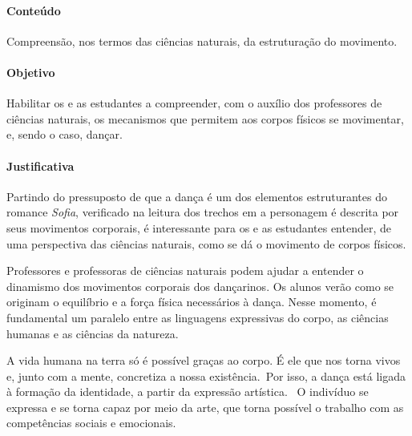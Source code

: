 \documentclass[12pt]{extarticle}
\begin{document}
\paragraph{Conteúdo} Compreensão, nos termos das ciências naturais, da estruturação do movimento.

\paragraph{Objetivo} Habilitar os e as estudantes a compreender, com o auxílio dos professores
de ciências naturais, os mecanismos que permitem aos corpos físicos se movimentar, e, sendo o caso,
dançar.

\paragraph{Justificativa} Partindo do pressuposto de que a dança é um dos elementos estruturantes
do romance \textit{Sofia}, verificado na leitura dos trechos em a personagem é descrita por seus
movimentos corporais, é interessante para os e as estudantes entender, de uma perspectiva
das ciências naturais, como se dá o movimento de corpos físicos. 

Professores e professoras de ciências naturais podem ajudar a
entender o dinamismo dos movimentos corporais dos dançarinos. Os alunos verão
como se originam o equilíbrio e a força física necessários à dança. Nesse momento, é fundamental
um paralelo entre as linguagens expressivas do corpo, as ciências humanas e as
ciências da natureza. 

A vida humana na terra só é possível graças ao corpo. É
ele que nos torna vivos e, junto com a mente, concretiza a nossa existência. Por isso, a dança está ligada à formação da identidade, a partir da expressão
artística.  O indivíduo se expressa e se torna capaz por meio da arte, que
torna possível o trabalho com as competências sociais e emocionais.
\end{document}
